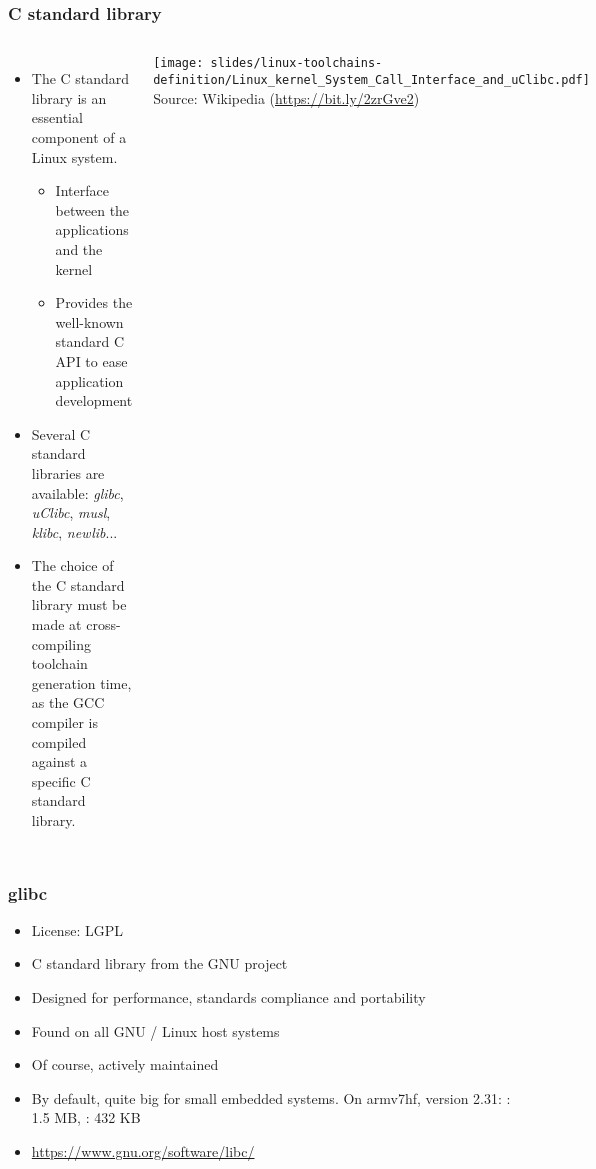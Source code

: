 \begin{frame}
  \frametitle{C standard library}
  \begin{columns}
    \begin{itemize}
    \item The C standard library is an essential component of a Linux system.
      \begin{itemize}
      \item Interface between the applications and the kernel
      \item Provides the well-known standard C API to ease application development
      \end{itemize}
    \item Several C standard libraries are available:
          {\em glibc}, {\em uClibc}, {\em musl}, {\em klibc}, {\em newlib}...
    \item The choice of the C standard library must be made at
          cross-compiling toolchain generation time, as the GCC compiler is
          compiled against a specific C standard library.
    \end{itemize}
    \texttt{[image: slides/linux-toolchains-definition/Linux\_kernel\_System\_Call\_Interface\_and\_uClibc.pdf]}\\
    {\tiny Source: Wikipedia (\url{https://bit.ly/2zrGve2})}
  \end{columns}
\end{frame}

\begin{frame}
  \frametitle{glibc}
  \begin{itemize}
  \item License: LGPL
  \item C standard library from the GNU project
  \item Designed for performance, standards compliance and portability
  \item Found on all GNU / Linux host systems
  \item Of course, actively maintained
  \item By default, quite big for small embedded systems.
        On armv7hf, version 2.31: : 1.5 MB, : 432 KB
  \item \url{https://www.gnu.org/software/libc/}
  \end{itemize}
\end{frame}

